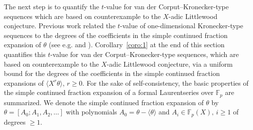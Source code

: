 \documentclass{article}
\newcommand{\ZZ}{\mathbb Z}
\newcommand{\RR}{\mathbb R}
\newcommand{\FF}{\mathbb{F}}
\renewcommand{\(}{\left (}
\renewcommand{\)}{\right )}
\theoremstyle{definition}
\numberwithin{equation}{section}
\begin{document}
The next step is to quantify the $t$-value for van der Corput--Kronecker-type sequences which are based on counterexample to the $X$-adic Littlewood conjecture. Previous work related the $t$-value of one-dimensional Kronecker-type sequences to the degrees of the coefficients in the simple continued fraction expansion of $\theta$ (see e.g. \cite{LarNie1993} and \cite{HoferdigKH}). Corollary~\ref{coro:1} at the end of this section quantifies this $t$-value for van der Corput--Kronecker-type sequences, which are based on counterexample to the $X$-adic Littlewood conjecture, via a uniform bound for the degrees of the coefficients in the simple continued fraction expansions of $\langle X^r\theta\rangle,\,r\geq 0$. 
For the sake of self-consistency, the basic properties of the simple continued fraction expansion of a formal Laurentseries over $\FF_p$ are summarized. We denote the simple continued fraction expansion of $\theta$ by $\theta=[A_0;A_1,A_2,\ldots]$ with polynomials $A_0=\theta-\langle\theta \rangle$ and $A_i\in\FF_p(X),\,i\geq 1$ of degrees $\geq 1$. %
\end{document}
